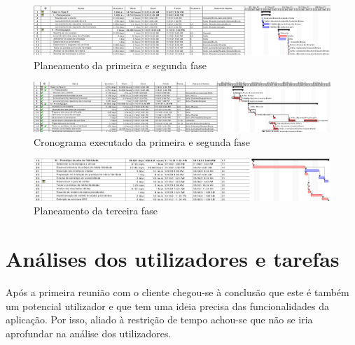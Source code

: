 \documentclass[11pt, twoside]{report}
\begin{document}
	


	\clearpage
	\begin{landscape}
		\pagestyle{empty}
		
		\begin{figure}[H] 
			\centering 			\includegraphics[width=1.4\textwidth,height=1.4\textheight,keepaspectratio]{image/planeamento_1fase}
			\caption{Planeamento da primeira e segunda fase}
			
		\end{figure}
	
	\begin{figure}[H] 
		\centering 			\includegraphics[width=1.4\textwidth,height=1.4\textheight,keepaspectratio]{image/cronogramaexecutado}
		\caption{Cronograma executado da primeira e segunda fase}
		\label{cronogramaexecutado}
	\end{figure}

	\begin{figure}[H] 
		\centering 			\includegraphics[width=1.4\textwidth,height=1.4\textheight,keepaspectratio]{image/Planeamentodaterceirafase}
		\caption{Planeamento da terceira fase}
		\label{planeamentoTerceiraFase}
	\end{figure}

	\end{landscape}


	
	
	\chapter{Análises dos utilizadores e tarefas}
	\label{analiseutilizador}
	
	Após a primeira reunião com o cliente chegou-se à conclusão que  este é também um potencial utilizador e que tem uma ideia precisa das funcionalidades da aplicação. Por isso, aliado à restrição de tempo achou-se que não se iria aprofundar na análise dos utilizadores. 
	
\end{document}

